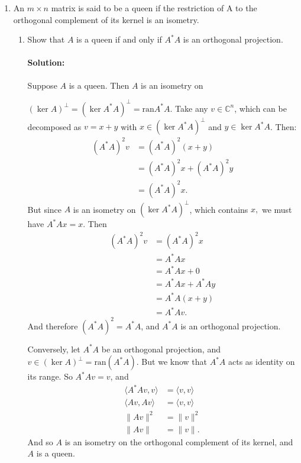 \documentclass{article}
\begin{document}
\begin{enumerate} 

\item An $m \times n$ matrix is said to be a queen if the restriction of A to the orthogonal complement of its kernel is an isometry.
\begin{enumerate}[label= (\alph*)] 
\item Show that $A$ is a queen if and only if $A^* A$ is an orthogonal projection.
    \paragraph{Solution: }Suppose $A$ is a queen. Then $A$ is an isometry on 

    $(\ker A)^{\perp}=(\ker A^* A)^{\perp}=\text{ran} A^* A$. Take any $v\in \mathbb{C}^{n}$, which can be decomposed as $v=x+y$ with $x\in (\ker A^* A)^\perp$ and $y\in \ker A^* A$. Then:
    \begin{align*}
        (A^* A)^2v&= (A^* A)^2(x+y) \\
            &= (A^* A)^2x +(A^* A)^2y\\
            &= (A^* A)^2x
    .\end{align*}
    But since $A$ is an isometry on $(\ker A^* A)^{\perp}$, which contains $x,$ we must have $A^* Ax=x$. Then
    \begin{align*}
        (A^* A)^2v &= (A^* A)^2x \\
        &= A^* Ax \\
        &= A^* Ax +0\\
        &= A^* Ax +A^* Ay\\
        &= A^* A(x+y)\\
        &= A^* Av
    .\end{align*}
    And therefore $(A^* A)^2=A^* A$, and $A^* A$ is an orthogonal projection.

    Conversely, let $A^* A$ be an orthogonal projection, and $v\in (\ker A)^{\perp}=\text{ran}(A^* A)$. But we know that $A^* A$ acts as identity on its range. So $A^* Av=v$, and
    \begin{align*}
       \langle A^* Av,v \rangle&= \langle v,v \rangle \\
       \langle Av,Av \rangle&= \langle v,v \rangle \\
       \|Av\|^2&= \|v\|^2 \\
       \|Av\|&= \|v\|
    .\end{align*}
    And so $A$ is an isometry on the orthogonal complement of its kernel, and $A$ is a queen.


\end{enumerate}
\end{enumerate}
\end{document}

